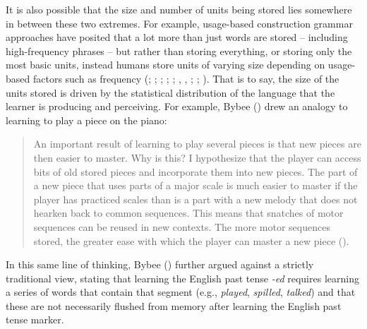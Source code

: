 \documentclass[
  12pt,
  letterpaper,
]{scrreport}
\begin{document}
It is also possible that the size and number of units being stored lies
somewhere in between these two extremes. For example, usage-based
construction grammar approaches have posited that a lot more than just
words are stored -- including high-frequency phrases -- but rather than
storing everything, or storing only the most basic units, instead humans
store units of varying size depending on usage-based factors such as
frequency (; ; ;
;
; ,
,
;
;
). That is to say, the size of the units stored is driven by the
statistical distribution of the language that the learner is producing
and perceiving. For example, Bybee () drew
an analogy to learning to play a piece on the piano:

\begin{quote}
An important result of learning to play several pieces is that new
pieces are then easier to master. Why is this? I hypothesize that the
player can access bits of old stored pieces and incorporate them into
new pieces. The part of a new piece that uses parts of a major scale is
much easier to master if the player has practiced scales than is a part
with a new melody that does not hearken back to common sequences. This
means that snatches of motor sequences can be reused in new contexts.
The more motor sequences stored, the greater ease with which the player
can master a new piece ().
\end{quote}

\noindent In this same line of thinking, Bybee
() further argued against a strictly
traditional view, stating that learning the English past tense
\emph{-ed} requires learning a series of words that contain that segment
(e.g., \emph{played}, \emph{spilled}, \emph{talked}) and that these are
not necessarily flushed from memory after learning the English past
tense marker.
\end{document}
